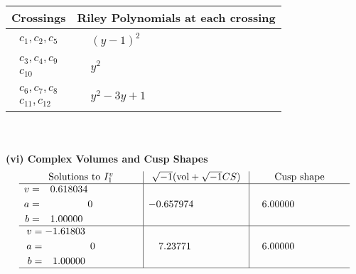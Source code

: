 \documentclass[1p]{elsarticle_modified}
\theoremstyle{definition}
\newcommand{\I}{\sqrt{-1}}
\begin{document}
\begin{tabular}{m{50pt}|m{274pt}}
Crossings & \hspace{64pt}Riley Polynomials at each crossing \\
\hline $$\begin{aligned}c_{1},c_{2},c_{5}\end{aligned}$$&$\begin{aligned}
&(y-1)^2
\end{aligned}$\\
\hline $$\begin{aligned}c_{3},c_{4},c_{9}\\c_{10}\end{aligned}$$&$\begin{aligned}
&y^2
\end{aligned}$\\
\hline $$\begin{aligned}c_{6},c_{7},c_{8}\\c_{11},c_{12}\end{aligned}$$&$\begin{aligned}
&y^2-3 y+1
\end{aligned}$\\
\hline
\end{tabular}\\~\\
\newpage\flushleft \textbf{(vi) Complex Volumes and Cusp Shapes}
$$\begin{array}{c|c|c}  
\text{Solutions to }I^v_{1}& \I (\text{vol} + \sqrt{-1}CS) & \text{Cusp shape}\\
 \hline 
\begin{aligned}
v &= \phantom{-}0.618034\phantom{ +0.000000I} \\
a &= \phantom{-0.000000 } 0 \\
b &= \phantom{-}1.00000\phantom{ +0.000000I}\end{aligned}
 & -0.657974\phantom{ +0.000000I} & \phantom{-}6.00000\phantom{ +0.000000I} \\ \hline\begin{aligned}
v &= -1.61803\phantom{ +0.000000I} \\
a &= \phantom{-0.000000 } 0 \\
b &= \phantom{-}1.00000\phantom{ +0.000000I}\end{aligned}
 & \phantom{-}7.23771\phantom{ +0.000000I} & \phantom{-}6.00000\phantom{ +0.000000I}\\
 \hline 
 \end{array}$$\newpage
\newpage\renewcommand{\arraystretch}{1}
\end{document}
